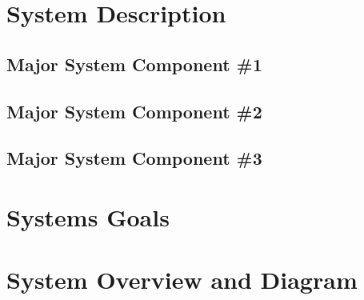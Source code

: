 \section{System Description}

\subsection{Major System Component \#1}

\subsection{Major System Component \#2}

\subsection{Major System Component \#3}

\section{Systems Goals}

\section{System Overview and Diagram}


